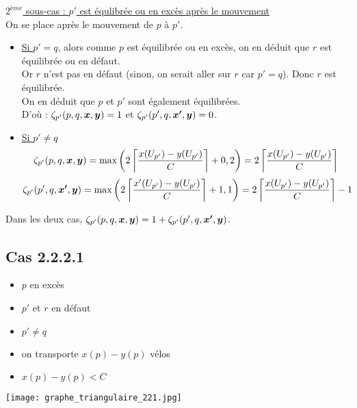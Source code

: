 \underline{$2^{ème}$ sous-cas : $p'$ est équlibrée ou en excès après le mouvement}\\
On se place après le mouvement de $p$ à $p'$.
\begin{itemize}
\item \underline{Si $p'=q$}, alors comme $p$ est équilibrée ou en excès, on en déduit que $r$ est équilibrée ou en défaut.\\
Or $r$ n'est pas en défaut (sinon, on serait aller sur $r$ car $p'=q$). Donc $r$ est équilibrée.\\
On en déduit que $p$ et $p'$ sont également équilibrées.\\
D'où : $\zeta_{p'}(p,q,\boldsymbol{x},\boldsymbol{y}) = 1$ et $\zeta_{p'}(p',q,\boldsymbol{x'},\boldsymbol{y}) = 0$.

\item \underline{Si $p' \ne q$}
\begin{equation}\notag
\zeta_{p'}(p,q,\boldsymbol{x},\boldsymbol{y})
= \mbox{max} \left( 2 \left\lceil \frac{x(U_{p'})-y(U_{p'})}{C} \right\rceil + 0, 2\right)
= 2 \left\lceil \frac{ x(U_{p'})-y(U_{p'})}{C} \right\rceil
\end{equation}
\begin{equation}\notag
\zeta_{p'}(p',q,\boldsymbol{x'},\boldsymbol{y})
= \mbox{max} \left( 2 \left\lceil \frac{x'(U_{p'})-y(U_{p'})}{C} \right\rceil + 1, 1\right)
= 2 \left\lceil \frac{x(U_{p'})-y(U_{p'})}{C} \right\rceil - 1
\end{equation}
\end{itemize}
Dans les deux cas, $\zeta_{p'}(p,q,\boldsymbol{x},\boldsymbol{y}) = 1 + \zeta_{p'}(p',q,\boldsymbol{x'},\boldsymbol{y})$.

\subsection*{Cas 2.2.2.1}

\begin{minipage}{0.5\linewidth}
\begin{itemize}
\item $p$ en excès
\item $p'$ et $r$ en défaut
\item $p' \ne q$
\item on transporte $x(p)-y(p)$ vélos
\item $x(p)-y(p) < C$
\end{itemize}
\end{minipage}
\begin{minipage}{0.5\linewidth}
\begin{center}
\texttt{[image: graphe\_triangulaire\_221.jpg]}
\end{center}
\end{minipage}

